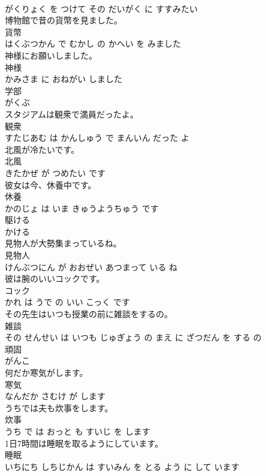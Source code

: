 \documentclass[8pt]{extreport}
\begin{document}
\begin{CJK}{UTF8}{min}
\\	がくりょく を つけて その だいがく に すすみたい			
\\	博物館で昔の貨幣を見ました。	
\\	貨幣 
\\	はくぶつかん で むかし の かへい を みました			
\\	神様にお願いしました。	
\\	神様 
\\	かみさま に おねがい しました			
\\	学部	
\\	がくぶ			
\\	スタジアムは観衆で満員だったよ。	
\\	観衆 
\\	すたじあむ は かんしゅう で まんいん だった よ			
\\	北風が冷たいです。	
\\	北風 
\\	きたかぜ が つめたい です			
\\	彼女は今、休養中です。	
\\	休養 
\\	かのじょ は いま きゅうようちゅう です			
\\	駆ける	
\\	かける			
\\	見物人が大勢集まっているね。	
\\	見物人 
\\	けんぶつにん が おおぜい あつまって いる ね			
\\	彼は腕のいいコックです。	
\\	コック 
\\	かれ は うで の いい こっく です			
\\	その先生はいつも授業の前に雑談をするの。	
\\	雑談 
\\	その せんせい は いつも じゅぎょう の まえ に ざつだん を する の			
\\	頑固	
\\	がんこ			
\\	何だか寒気がします。	
\\	寒気 
\\	なんだか さむけ が します			
\\	うちでは夫も炊事をします。	
\\	炊事 
\\	うち で は おっと も すいじ を します			
\\	1日7時間は睡眠を取るようにしています。	
\\	睡眠 
\\	いちにち しちじかん は すいみん を とる よう に して います			

\end{CJK}
\end{document}
